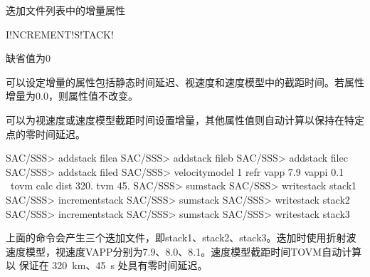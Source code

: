 \label{sss:incrementstack}

迭加文件列表中的增量属性

\begin{SACSTX}
I!NCREMENT!S!TACK!
\end{SACSTX}

缺省值为0

可以设定增量的属性包括静态时间延迟、视速度和速度模型中的截距时间。若属性
增量为0.0，则属性值不改变。

可以为视速度或速度模型截距时间设置增量，其他属性值则自动计算以保持在特定点的零时间延迟。

\begin{SACCode}
SAC/SSS> addstack filea
SAC/SSS> addstack fileb
SAC/SSS> addstack filec
SAC/SSS> addstack filed
SAC/SSS> velocitymodel 1 refr vapp 7.9 vappi 0.1 \
                        tovm calc dist 320. tvm 45.
SAC/SSS> sumstack
SAC/SSS> writestack stack1
SAC/SSS> incrementstack
SAC/SSS> sumstack
SAC/SSS> writestack stack2
SAC/SSS> incrementstack
SAC/SSS> sumstack
SAC/SSS> writestack stack3
\end{SACCode}

上面的命令会产生三个迭加文件，即stack1、stack2、stack3。迭加时使用折射波
速度模型，视速度VAPP分别为7.9、8.0、8.1。速度模型截距时间TOVM自动计算以
保证在 \SI{320}{\km}、\SI{45}{\s} 处具有零时间延迟。
